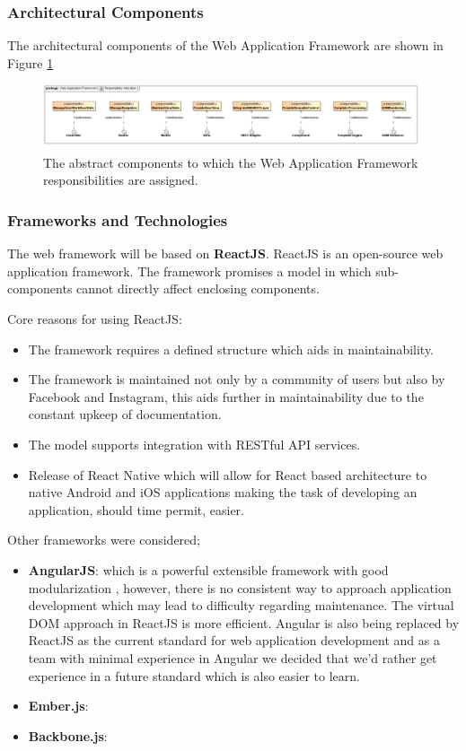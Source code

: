 \subsubsection{Architectural Components}
The architectural components of the  Web Application Framework are shown in Figure \ref{fig:webApplicationFrameworkResponsibilityAllocation}
\begin{figure}[H]
	\begin{center}
	\includegraphics[scale=0.35]{../Diagrams and Charts/Web Application Framework/ResponsibilityAllocation.jpg}
	\caption{The abstract components to which the Web Application Framework responsibilities are assigned.}
	\label{fig:webApplicationFrameworkResponsibilityAllocation}
	\end{center}
\end{figure}

\subsubsection{Frameworks and Technologies}
The web framework will be based on \textbf{ReactJS}. ReactJS is an open-source web
application framework. The framework promises a model in which sub-components
cannot directly affect enclosing components.

Core reasons for using ReactJS:
\begin{itemize}
	\item The framework requires a defined structure which aids in maintainability.
	\item The framework is maintained not only by a community of users but also
	by Facebook and Instagram, this aids further in maintainability due to the 
	constant upkeep of documentation.
	\item The model supports integration with RESTful API services.
	\item Release of React Native which will allow for React based architecture 
	to native Android and iOS applications making the task of developing an 
	application, should time permit, easier.
\end{itemize}
Other frameworks were considered;
\begin{itemize}
	\item \textbf{AngularJS}: which is a powerful extensible framework with good modularization
, however, there is no consistent way to approach application development which may 
lead to difficulty regarding maintenance. The virtual DOM approach in ReactJS is more
efficient. Angular is also being replaced by ReactJS as the current standard for web 
application development and as a team with minimal experience in Angular we decided 
that we'd rather get experience in a future standard which is also easier to learn.
	\item \textbf{Ember.js}: 
	\item \textbf{Backbone.js}:
\end{itemize}

